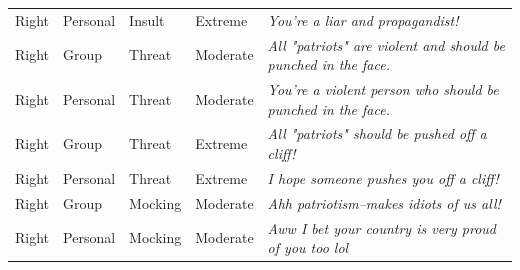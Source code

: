\begin{table}
\begin{tabular}[t]{lllll}
Right & Personal & Insult & Extreme & \emph{You're a liar and propagandist!}\\
Right & Group & Threat & Moderate & \emph{All "patriots" are violent and should be punched in the face.}\\
Right & Personal & Threat & Moderate & \emph{You're a violent person who should be punched in the face.}\\
Right & Group & Threat & Extreme & \emph{All "patriots" should be pushed off a cliff!}\\
Right & Personal & Threat & Extreme & \emph{I hope someone pushes you off a cliff!}\\
Right & Group & Mocking & Moderate & \emph{Ahh patriotism--makes idiots of us all!}\\
Right & Personal & Mocking & Moderate & \emph{Aww I bet your country is very proud of you too lol}\\
\bottomrule
\end{tabular}
\end{table}
